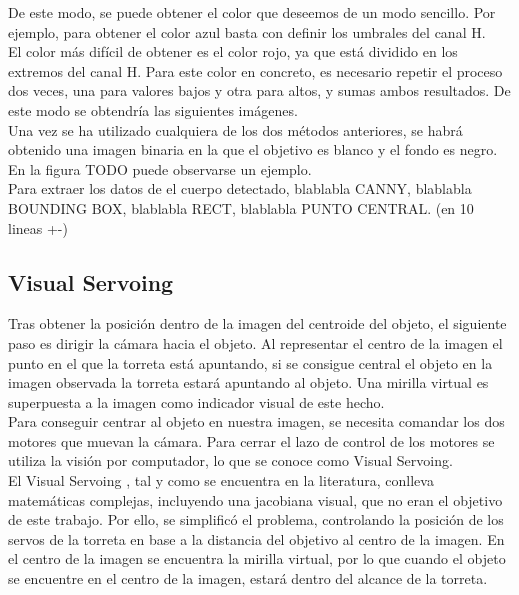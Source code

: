 De este modo, se puede obtener el color que deseemos de un modo sencillo. Por ejemplo, para obtener el color azul basta con definir los umbrales del canal H.\\

El color más difícil de obtener es el color rojo, ya que está dividido en los extremos del canal H. Para este color en concreto, es necesario repetir el proceso dos veces, una para valores bajos y otra para altos, y sumas ambos resultados. De este modo se obtendría las siguientes imágenes.\\

Una vez se ha utilizado cualquiera de los dos métodos anteriores, se habrá obtenido una imagen binaria en la que el objetivo es blanco y el fondo es negro. En la figura TODO puede observarse un ejemplo.\\

Para extraer los datos de el cuerpo detectado, blablabla CANNY, blablabla BOUNDING BOX, blablabla RECT, blablabla PUNTO CENTRAL. (en 10 lineas +-)\\

\subsection{Visual Servoing}
Tras obtener la posición dentro de la imagen del centroide del objeto, el siguiente paso es dirigir la cámara hacia el objeto. Al representar el centro de la imagen el punto en el que la torreta está apuntando, si se consigue central el objeto en la imagen observada la torreta estará apuntando al objeto. Una mirilla virtual es superpuesta a la imagen como indicador visual de este hecho.\\

Para conseguir centrar al objeto en nuestra imagen, se necesita comandar los dos motores que muevan la cámara. Para cerrar el lazo de control de los motores se utiliza la visión por computador, lo que se conoce como Visual Servoing.\\

El Visual Servoing , tal y como se encuentra en la literatura, conlleva matemáticas complejas, incluyendo una jacobiana visual, que no eran el objetivo de este trabajo. Por ello, se simplificó el problema, controlando la posición de los servos de la torreta en base a la distancia del objetivo al centro de la imagen. En el centro de la imagen se encuentra la mirilla virtual, por lo que cuando el objeto se encuentre en el centro de la imagen, estará dentro del alcance de la torreta.\\

